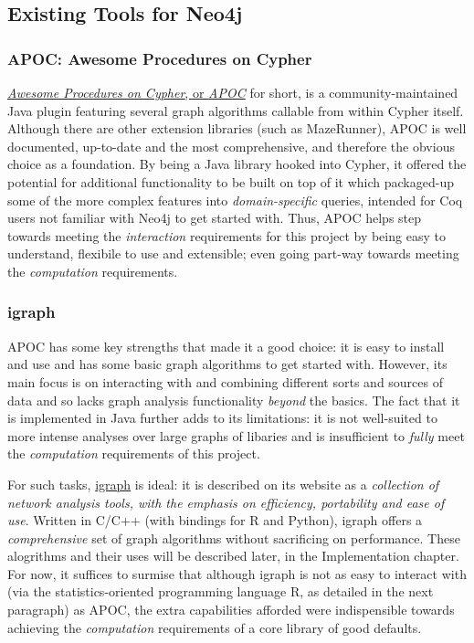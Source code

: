 \subsection{Existing Tools for Neo4j}

\subsubsection{APOC: Awesome Procedures on Cypher}

\href{http://github.com/neo4j-contrib/neo4j-apoc-procedures}{\emph{Awesome
Procedures on Cypher}, or \emph{APOC}} for short, is a community-maintained Java
plugin featuring several graph algorithms callable from within Cypher itself.
Although there are other extension libraries (such as MazeRunner), APOC is well
documented, up-to-date and the most comprehensive, and therefore the obvious
choice as a foundation. By being a Java library hooked into Cypher, it offered
the potential for additional functionality to be built on top of it which
packaged-up some of the more complex features into \emph{domain-specific}
queries, intended for Coq users not familiar with Neo4j to get started with.
Thus, APOC helps step towards meeting the \emph{interaction} requirements for
this project by being easy to understand, flexibile to use and extensible; even
going part-way towards meeting the \emph{computation} requirements.

\subsubsection{igraph}

APOC has some key strengths that made it a good choice: it is easy to install
and use and has some basic graph algorithms to get started with.  However, its
main focus is on interacting with and combining different sorts and sources of
data and so lacks graph analysis functionality \emph{beyond} the basics. The
fact that it is implemented in Java further adds to its limitations: it is not
well-suited to more intense analyses over large graphs of libaries and is
insufficient to \emph{fully} meet the \emph{computation} requirements of this
project.

For such tasks, \href{http://www.igraph.org}{igraph} is ideal: it is described
on its website as a \emph{collection of network analysis tools, with the
emphasis on efficiency, portability and ease of use}. Written in C/C++ (with
bindings for R and Python), igraph offers a \emph{comprehensive} set of graph
algorithms without sacrificing on performance. These alogrithms and their uses
will be described later, in the Implementation chapter. For now, it suffices to
surmise that although igraph is not as easy to interact with (via the
statistics-oriented programming language R, as detailed in the next paragraph)
as APOC, the extra capabilities afforded were indispensible towards achieving
the \emph{computation} requirements of a core library of good defaults.

